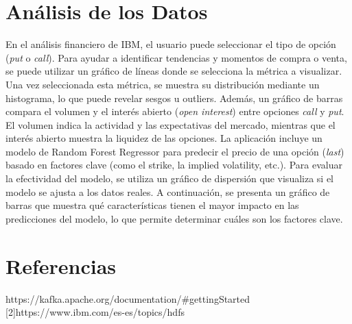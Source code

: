 \documentclass{article}
\begin{document}
\section{Análisis de los Datos}
	En el análisis financiero de IBM, el usuario puede seleccionar el tipo de opción (\textit{put} o \textit{call}). Para ayudar a identificar tendencias y momentos de compra o venta, se puede utilizar un gráfico de líneas donde se selecciona la métrica a visualizar. Una vez seleccionada esta métrica, se muestra su distribución mediante un histograma, lo que puede revelar sesgos u outliers. Además, un gráfico de barras compara el volumen y el interés abierto (\textit{open interest}) entre opciones \textit{call} y \textit{put}. El volumen indica la actividad y las expectativas del mercado, mientras que el interés abierto muestra la liquidez de las opciones. La aplicación incluye un modelo de Random Forest Regressor para predecir el precio de una opción (\textit{last}) basado en factores clave (como el strike, la implied volatility, etc.). Para evaluar la efectividad del modelo, se utiliza un gráfico de dispersión que visualiza si el modelo se ajusta a los datos reales. A continuación, se presenta un gráfico de barras que muestra qué características tienen el mayor impacto en las predicciones del modelo, lo que permite determinar cuáles son los factores clave.
	\section{Referencias}
	
	\begin{flushleft}
		[1]https://kafka.apache.org/documentation/\#gettingStarted\\
	
	[2]https://www.ibm.com/es-es/topics/hdfs
	\end{flushleft}
\end{document}

